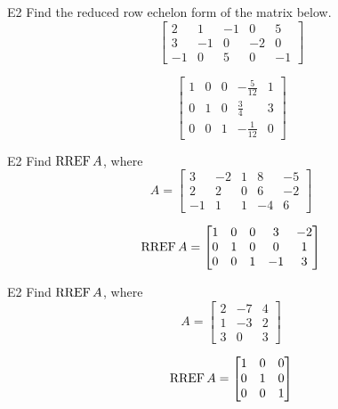 \begin{problem}{E2}
Find the reduced row echelon form of the matrix below.
\[
  \begin{bmatrix}
    2 & 1 & -1 & 0 & 5 \\
    3 & -1 & 0 & -2 & 0 \\
    -1 & 0 & 5 & 0 & -1
  \end{bmatrix}
\]
\end{problem}
\begin{solution}
\[
  \begin{bmatrix}
  1 & 0 & 0 & -\frac{5}{12} & 1 \\
   0 & 1 & 0 & \frac{3}{4} & 3 \\
   0 & 0 & 1 & -\frac{1}{12} & 0
  \end{bmatrix}
\]
\end{solution}

\begin{problem}{E2}
Find \(\operatorname{RREF} A\), where
\[
  A =
  \begin{bmatrix}
    3 & -2 & 1 & 8 & -5 \\
    2 & 2 & 0 & 6 & -2 \\
    -1 & 1 & 1 & -4 & 6
  \end{bmatrix}
\]
\end{problem}
\begin{solution}
\[
  \operatorname{RREF} A =
  \begin{bmatrix}
    1 & 0 & 0 & 3 & -2 \\
    0 & 1 & 0 & 0 & 1 \\
    0 & 0 & 1 & -1 & 3
  \end{bmatrix}
\]
\end{solution}

\begin{problem}{E2}
Find \(\operatorname{RREF} A\), where
\[
  A =
  \begin{bmatrix}
    2 & -7 & 4 \\
    1 & -3 & 2 \\
    3 & 0 & 3
  \end{bmatrix}
\]
\end{problem}
\begin{solution}
\[
  \operatorname{RREF} A =
  \begin{bmatrix}
    1 & 0 & 0 \\
    0 & 1 & 0 \\
    0 & 0 & 1
  \end{bmatrix}
\]
\end{solution}

